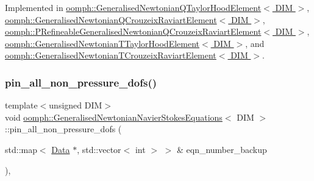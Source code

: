 Implemented in \hyperlink{classoomph_1_1GeneralisedNewtonianQTaylorHoodElement_a88023b1b2683128df3e56181b80105ea}{oomph\+::\+Generalised\+Newtonian\+Q\+Taylor\+Hood\+Element$<$ D\+I\+M $>$}, \hyperlink{classoomph_1_1GeneralisedNewtonianQCrouzeixRaviartElement_ab7a1cfbce6b38ad1df95a9c3a6b8f597}{oomph\+::\+Generalised\+Newtonian\+Q\+Crouzeix\+Raviart\+Element$<$ D\+I\+M $>$}, \hyperlink{classoomph_1_1PRefineableGeneralisedNewtonianQCrouzeixRaviartElement_a2c14443dfbea1eedbafd06caca166dd9}{oomph\+::\+P\+Refineable\+Generalised\+Newtonian\+Q\+Crouzeix\+Raviart\+Element$<$ D\+I\+M $>$}, \hyperlink{classoomph_1_1GeneralisedNewtonianTTaylorHoodElement_a9d33cb4f837d7a231ff654acc2cd5f0f}{oomph\+::\+Generalised\+Newtonian\+T\+Taylor\+Hood\+Element$<$ D\+I\+M $>$}, and \hyperlink{classoomph_1_1GeneralisedNewtonianTCrouzeixRaviartElement_a8338447861d4a7757eafc8eeda941643}{oomph\+::\+Generalised\+Newtonian\+T\+Crouzeix\+Raviart\+Element$<$ D\+I\+M $>$}.

\mbox{\label{classoomph_1_1GeneralisedNewtonianNavierStokesEquations_a5b85b22f90a38b141620ec1720070311}} 
\subsubsection{\texorpdfstring{pin\+\_\+all\+\_\+non\+\_\+pressure\+\_\+dofs()}{pin\_all\_non\_pressure\_dofs()}}
{\footnotesize\ttfamily template$<$unsigned D\+IM$>$ \\
void \hyperlink{classoomph_1_1GeneralisedNewtonianNavierStokesEquations}{oomph\+::\+Generalised\+Newtonian\+Navier\+Stokes\+Equations}$<$ D\+IM $>$\+::pin\+\_\+all\+\_\+non\+\_\+pressure\+\_\+dofs (\begin{DoxyParamCaption}\item[{std\+::map$<$ \hyperlink{classoomph_1_1Data}{Data} $\ast$, std\+::vector$<$ int $>$ $>$ \&}]{eqn\+\_\+number\+\_\+backup }\end{DoxyParamCaption})\hspace{0.3cm}{\ttfamily [inline]}, {\ttfamily [virtual]}}



